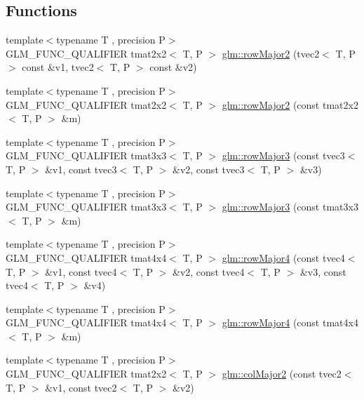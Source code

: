 \subsection*{Functions}
\begin{DoxyCompactItemize}
\item 
{\footnotesize template$<$typename T , precision P$>$ }\\G\+L\+M\+\_\+\+F\+U\+N\+C\+\_\+\+Q\+U\+A\+L\+I\+F\+I\+E\+R tmat2x2$<$ T, P $>$ \hyperlink{group__gtx__matrix__major__storage_ga0c7f4d56a85865f0002127119ab7d551}{glm\+::row\+Major2} (tvec2$<$ T, P $>$ const \&v1, tvec2$<$ T, P $>$ const \&v2)
\item 
{\footnotesize template$<$typename T , precision P$>$ }\\G\+L\+M\+\_\+\+F\+U\+N\+C\+\_\+\+Q\+U\+A\+L\+I\+F\+I\+E\+R tmat2x2$<$ T, P $>$ \hyperlink{namespaceglm_a1f0fe9110e79b5cce1d9b90a37aeb588}{glm\+::row\+Major2} (const tmat2x2$<$ T, P $>$ \&m)
\item 
{\footnotesize template$<$typename T , precision P$>$ }\\G\+L\+M\+\_\+\+F\+U\+N\+C\+\_\+\+Q\+U\+A\+L\+I\+F\+I\+E\+R tmat3x3$<$ T, P $>$ \hyperlink{namespaceglm_a782684c2273dd5745cfeb6fb34c1164c}{glm\+::row\+Major3} (const tvec3$<$ T, P $>$ \&v1, const tvec3$<$ T, P $>$ \&v2, const tvec3$<$ T, P $>$ \&v3)
\item 
{\footnotesize template$<$typename T , precision P$>$ }\\G\+L\+M\+\_\+\+F\+U\+N\+C\+\_\+\+Q\+U\+A\+L\+I\+F\+I\+E\+R tmat3x3$<$ T, P $>$ \hyperlink{namespaceglm_a5e0ea3822d5b2947a3e9b50d912f25ad}{glm\+::row\+Major3} (const tmat3x3$<$ T, P $>$ \&m)
\item 
{\footnotesize template$<$typename T , precision P$>$ }\\G\+L\+M\+\_\+\+F\+U\+N\+C\+\_\+\+Q\+U\+A\+L\+I\+F\+I\+E\+R tmat4x4$<$ T, P $>$ \hyperlink{namespaceglm_af2dd40e8dcdf8b7a0a80a941e3e1811c}{glm\+::row\+Major4} (const tvec4$<$ T, P $>$ \&v1, const tvec4$<$ T, P $>$ \&v2, const tvec4$<$ T, P $>$ \&v3, const tvec4$<$ T, P $>$ \&v4)
\item 
{\footnotesize template$<$typename T , precision P$>$ }\\G\+L\+M\+\_\+\+F\+U\+N\+C\+\_\+\+Q\+U\+A\+L\+I\+F\+I\+E\+R tmat4x4$<$ T, P $>$ \hyperlink{namespaceglm_adc5ece283b1d71979ae91132f28ffb83}{glm\+::row\+Major4} (const tmat4x4$<$ T, P $>$ \&m)
\item 
{\footnotesize template$<$typename T , precision P$>$ }\\G\+L\+M\+\_\+\+F\+U\+N\+C\+\_\+\+Q\+U\+A\+L\+I\+F\+I\+E\+R tmat2x2$<$ T, P $>$ \hyperlink{namespaceglm_aae808fcd7cca78d060bdbe4bf188bc06}{glm\+::col\+Major2} (const tvec2$<$ T, P $>$ \&v1, const tvec2$<$ T, P $>$ \&v2)

\end{DoxyCompactItemize}
